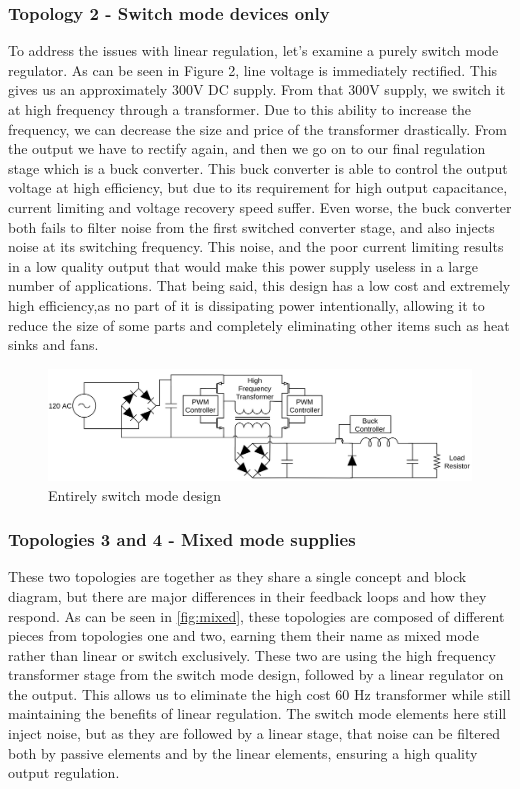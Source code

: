 \documentclass[12pt]{article}
\begin{document}
\subsubsection{Topology 2 - Switch mode devices only}
To address the issues with linear regulation, let's examine a purely switch mode 
regulator. As can be seen in Figure 2, line voltage is immediately rectified. 
This gives us an approximately 300V DC supply. From that 300V supply, we switch 
it at high frequency through a transformer. Due to this ability to increase the 
frequency, we can decrease the size and price of the transformer drastically. From 
the output we have to rectify again, and then we go on to our final regulation stage 
which is a buck converter. This buck converter is able to control the output voltage 
at high efficiency, but due to its requirement for high output capacitance, current 
limiting and voltage recovery speed suffer. Even worse, the buck converter both 
fails to filter noise from the first switched converter stage, and also injects 
noise at its switching frequency. This noise, and the poor current limiting results 
in a low quality output that would make this power supply useless in a large number 
of applications. That being said, this design has a low cost and extremely high 
efficiency,as no part of it is dissipating power intentionally, allowing it to 
reduce the size of some parts and completely eliminating other items such as heat 
sinks and fans.

\begin{figure}[H]
    \includegraphics[width=\textwidth]{switched}
    \caption{Entirely switch mode design}
    \label{fig:switched}
\end{figure}
\subsubsection{Topologies 3 and 4 - Mixed mode supplies}

These two topologies are together as they share a single concept and block diagram, 
but there are major differences in their feedback loops and how they respond. 
As can be seen in \autoref{fig:mixed}, these topologies are composed of different pieces 
from topologies one and two, earning them their name as mixed mode rather than 
linear or switch exclusively. These two are using the high frequency transformer 
stage from the switch mode design, followed by a linear regulator on the output. 
This allows us to eliminate the high cost 60 Hz transformer while still maintaining 
the benefits of linear regulation. The switch mode elements here still inject noise, 
but as they are followed by a linear stage, that noise can be filtered both by passive 
elements and by the linear elements, ensuring a high quality output regulation.  
\end{document}
